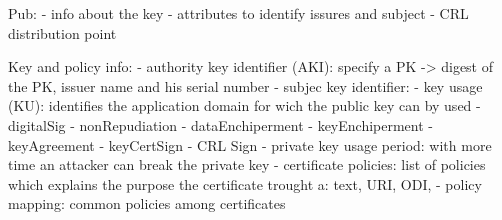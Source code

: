 \documentclass[12pt]{article}
\begin{document}
Pub:
- info about the key 
- attributes to identify issures and subject
- CRL distribution point 

Key and policy info:
- authority key identifier (AKI): specify a PK -> digest of the PK, issuer name and his serial number
- subjec key identifier: 
- key usage (KU): identifies the application domain for wich the public key can by used 
  - digitalSig
  - nonRepudiation 
  - dataEnchiperment
  - keyEnchiperment
  - keyAgreement
  - keyCertSign
  - CRL Sign
- private key usage period: with more time an attacker can break the private key
- certificate policies: list of policies which explains the purpose the certificate trought a: text, URI, ODI,
- policy mapping: common policies among certificates
\end{document}
